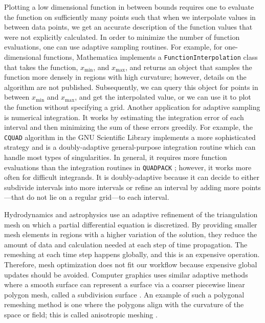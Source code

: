 
Plotting a low dimensional function in between bounds requires one to evaluate the function on sufficiently many points such that when we interpolate values in between data points, we get an accurate description of the function values that were not explicitly calculated.
In order to minimize the number of function evaluations, one can use adaptive sampling routines.
For example, for one-dimensional functions, Mathematica \cite{WolframResearch} implements a \passthrough{\lstinline!FunctionInterpolation!} class that takes the function, $x_\textrm{min}$, and $x_\textrm{max}$, and returns an object that samples the function more densely in regions with high curvature; however, details on the algorithm are not published.
Subsequently, we can query this object for points in between $x_\textrm{min}$ and $x_\textrm{max}$, and get the interpolated value, or we can use it to plot the function without specifying a grid.
Another application for adaptive sampling is numerical integration.
It works by estimating the integration error of each interval and then minimizing the sum of these errors greedily.
For example, the \passthrough{\lstinline!CQUAD!} algorithm \cite{Gonnet2010} in the GNU Scientific Library \cite{Galassi1996} implements a more sophisticated strategy and is a doubly-adaptive general-purpose integration routine which can handle most types of singularities.
In general, it requires more function evaluations than the integration routines in \passthrough{\lstinline!QUADPACK!} \cite{Galassi1996}; however, it works more often for difficult integrands.
It is doubly-adaptive because it can decide to either subdivide intervals into more intervals or refine an interval by adding more points---that do not lie on a regular grid---to each interval.


Hydrodynamics \cite{Berger1989, Berger1984} and astrophysics \cite{Klein1999} use an adaptive refinement of the triangulation mesh on which a partial differential equation is discretized.
By providing smaller mesh elements in regions with a higher variation of the solution, they reduce the amount of data and calculation needed at each step of time propagation.
The remeshing at each time step happens globally, and this is an expensive operation.
Therefore, mesh optimization does not fit our workflow because expensive global updates should be avoided.
Computer graphics uses similar adaptive methods where a smooth surface can represent a surface via a coarser piecewise linear polygon mesh, called a subdivision surface \cite{DeRose1998}.
An example of such a polygonal remeshing method is one where the polygons align with the curvature of the space or field; this is called anisotropic meshing \cite{Alliez2003}.

